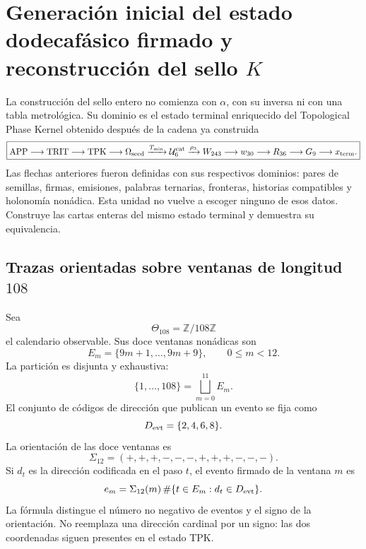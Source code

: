 \label{chap:83-10}


\section{Generación inicial del estado dodecafásico firmado y reconstrucción del sello \(K\)}
\label{p12-83-c10-s1:chap:registro-dodecafasico-hadamard-k}

La construcción del sello entero no comienza con \(\alpha\), con su inversa
ni con una tabla metrológica. Su dominio es el estado terminal enriquecido
del Topological Phase Kernel obtenido después de la cadena ya construida
\begin{equation}
 \boxed{
 \mathrm{APP}\longrightarrow\mathrm{TRIT}\longrightarrow\mathrm{TPK}
 \longrightarrow\Omega_{\rm seed}
 \xrightarrow{T_{\min}}\mathcal U_6^{\rm cat}
 \xrightarrow{\rho_3}W_{243}
 \longrightarrow w_{30}\longrightarrow R_{36}
 \longrightarrow G_9\longrightarrow x_{\rm term}.}
 \label{p12-83-c10-s1:eq:cadena-upstream-registro-dodecafasico}
\end{equation}
Las flechas anteriores fueron definidas con sus respectivos dominios:
pares de semillas, firmas, emisiones, palabras ternarias, fronteras,
historias compatibles y holonomía nonádica. Esta unidad no vuelve a escoger
ninguno de esos datos. Construye las cartas enteras del mismo estado
terminal y demuestra su equivalencia.

\subsection{Trazas orientadas sobre ventanas de longitud \(108\)}

Sea
\[
 \Theta_{108}=\mathbb Z/108\mathbb Z
\]
el calendario observable. Sus doce ventanas nonádicas son
\[
 E_m=\{9m+1,\ldots,9m+9\},
 \qquad 0\leq m<12.
\]
La partición es disjunta y exhaustiva:
\[
 \{1,\ldots,108\}=\bigsqcup_{m=0}^{11}E_m.
\]
El conjunto de códigos de dirección que publican un evento se fija como
\[
 D_{\rm evt}=\{2,4,6,8\}.
\]
La orientación de las doce ventanas es
\begin{equation}
 \Sigma_{12}=(+,+,+,-,-,-,+,+,+,-,-,-).
 \label{p12-83-c10-s1:eq:signatura-doce-ventanas}
\end{equation}
Si \(d_t\) es la dirección codificada en el paso \(t\), el evento firmado
de la ventana \(m\) es
\begin{equation}
 e_m=\Sigma_{12}(m)\,
 \#\{t\in E_m:d_t\in D_{\rm evt}\}.
 \label{p12-83-c10-s1:eq:evento-firmado-ventana}
\end{equation}
La fórmula distingue el número no negativo de eventos y el signo de la
orientación. No reemplaza una dirección cardinal por un signo: las dos
coordenadas siguen presentes en el estado TPK.


